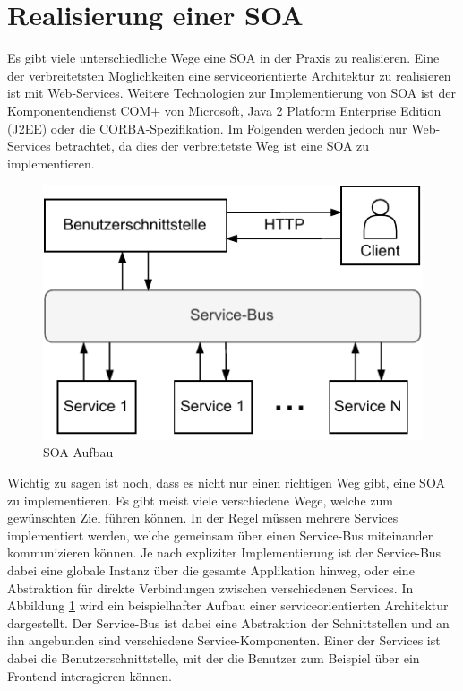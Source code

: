 \section{Realisierung einer SOA}
\label{ch:realization}


Es gibt viele unterschiedliche Wege eine SOA in der Praxis zu realisieren. Eine der verbreitetsten Möglichkeiten eine serviceorientierte Architektur zu realisieren ist mit Web-Services. Weitere Technologien zur Implementierung von SOA ist der Komponentendienst COM+ von Microsoft, Java 2 Platform Enterprise Edition (J2EE) oder die CORBA-Spezifikation. Im Folgenden werden jedoch nur Web-Services betrachtet, da dies der verbreitetste Weg ist eine SOA zu implementieren.


\begin{figure}[H]
    \centering
    \includegraphics[width=.7\textwidth]{images/SOA-Service-Bus.drawio.pdf}
    \caption{SOA Aufbau}
    \label{fig:soa-aufbau}
\end{figure}

Wichtig zu sagen ist noch, dass es nicht nur einen richtigen Weg gibt, eine SOA zu implementieren. Es gibt meist viele verschiedene Wege, welche zum gewünschten Ziel führen können. In der Regel müssen mehrere Services implementiert werden, welche gemeinsam über einen Service-Bus miteinander kommunizieren können. Je nach expliziter Implementierung ist der Service-Bus dabei eine globale Instanz über die gesamte Applikation hinweg, oder eine Abstraktion für direkte Verbindungen zwischen verschiedenen Services. In Abbildung \ref{fig:soa-aufbau} wird ein beispielhafter Aufbau einer serviceorientierten Architektur dargestellt. Der Service-Bus ist dabei eine Abstraktion der Schnittstellen und an ihn angebunden sind verschiedene Service-Komponenten. Einer der Services ist dabei die Benutzerschnittstelle, mit der die Benutzer zum Beispiel über ein Frontend interagieren können.

